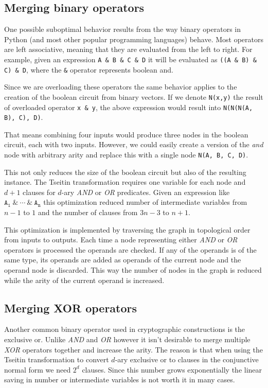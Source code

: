 \subsection{Merging binary operators}

One possible suboptimal behavior results from the way binary operators in Python (and most other popular programming languages) behave.
Most operators are left associative, meaning that they are evaluated from the left to right.
For example, given an expression \texttt{A \& B \& C \& D} it will be evaluated as \texttt{((A \& B) \& C) \& D}, where the \texttt{\&} operator represents boolean and.

Since we are overloading these operators the same behavior applies to the creation of the boolean circuit from binary vectors.
If we denote \texttt{N(x,y)} the result of overloaded operator \texttt{x \& y}, the above expression would result into \texttt{N(N(N(A, B), C), D)}.

That means combining four inputs would produce three nodes in the boolean circuit, each with two inputs.
However, we could easily create a version of the \emph{and} node with arbitrary arity and replace this with a single node \texttt{N(A, B, C, D)}.

This not only reduces the size of the boolean circuit but also of the resulting instance. 
The Tseitin transformation requires one variable for each node and $d+1$ clauses for $d$-ary \emph{AND} or \emph{OR} predicates.
Given an expression like $\texttt{A}_\texttt{1} ~\&~ \cdots ~\&~ \texttt{A}_\texttt{n}$ this optimization reduced number of intermediate variables from $n-1$ to $1$ and the number of clauses from $3n-3$ to $n+1$.

This optimization is implemented by traversing the graph in topological order from inputs to outputs.
Each time a node representing either \emph{AND} or \emph{OR} operators is processed the operands are checked.
If any of the operands is of the same type, its operands are added as operands of the current node and the operand node is discarded.
This way the number of nodes in the graph is reduced while the arity of the current operand is increased.

\subsection{Merging XOR operators}
Another common binary operator used in cryptographic constructions is the exclusive or.
Unlike \emph{AND} and \emph{OR} however it isn't desirable to merge multiple \emph{XOR} operators together and increase the arity.
The reason is that when using the Tseitin transformation to convert $d$-ary exclusive or to clauses in the conjunctive normal form we need $2^d$ clauses.
Since this number grows exponentially the linear saving in number or intermediate variables is not worth it in many cases.

